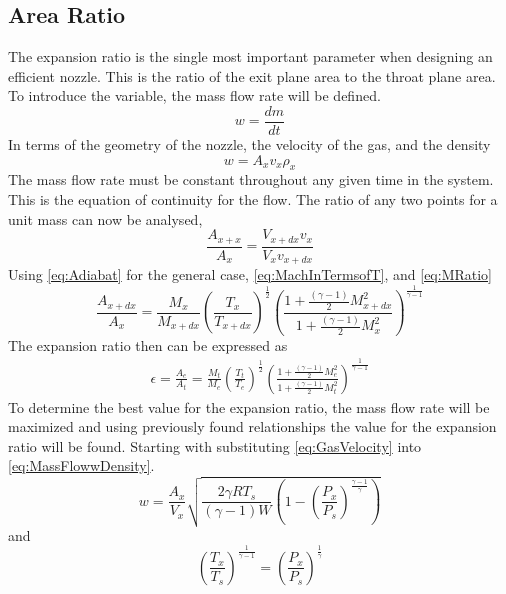 \subsection{Area Ratio}
The expansion ratio is the single most important parameter when designing an efficient nozzle. This is the ratio of the exit plane area to the throat plane area. To introduce the variable, the mass flow rate will be defined.
\begin{equation}\label{eq:MassFlow}
w=\frac{dm}{dt}
\end{equation}
In terms of the geometry of the nozzle, the velocity of the gas, and the density
\begin{equation}
w=A_xv_x\rho_x
\end{equation}%
The mass flow rate must be constant throughout any given time in the system. This is the equation of continuity for the flow. The ratio of any two points for a unit mass can now be analysed,
\begin{equation}\label{eq:MassFlowwDensity}
\frac{A_{x+x}}{A_x}=\frac{V_{x+dx}v_x}{V_xv_{x+dx}}
\end{equation}
Using \ref{eq:Adiabat} for the general case, \ref{eq:MachInTermsofT}, and \ref{eq:MRatio}
\begin{equation}
\frac{A_{x+dx}}{A_x}=\frac{M_x}{M_{x+dx}}\left(\frac{T_x}{T_{x+dx}}\right)^\frac{1}{2}\left(\frac{1+\frac{(\gamma-1)}{2}M_{x+dx}^2}{1+\frac{(\gamma-1)}{2}M_x^2}\right)^{\frac{1}{\gamma-1}}
\end{equation}
The expansion ratio then can be expressed as
\begin{align}
\epsilon=\frac{A_e}{A_t}=\frac{M_t}{M_e}\left(\frac{T_t}{T_e}\right)^\frac{1}{2}\left(\frac{1+\frac{(\gamma-1)}{2}M_e^2}{1+\frac{(\gamma-1)}{2}M_t^2}\right)^{\frac{1}{\gamma-1}}
\end{align}%
To determine the best value for the expansion ratio, the mass flow rate will be maximized and using previously found relationships the value for the expansion ratio will be found. Starting with substituting \ref{eq:GasVelocity} into \ref{eq:MassFlowwDensity}.
\begin{equation}\label{eq:WforAll}
w=\frac{A_x}{V_x}\sqrt{\frac{2\gamma RT_s}{(\gamma-1)W}\left(1-\left(\frac{P_x}{P_s}\right)^{\frac{\gamma-1}{\gamma}}\right)}
\end{equation}
and
\begin{equation}\label{eq:TtoP}
\left(\frac{T_x}{T_s}\right)^{\frac{1}{\gamma-1}}=\left(\frac{P_x}{P_s}\right)^{\frac{1}{\gamma}}
\end{equation}
